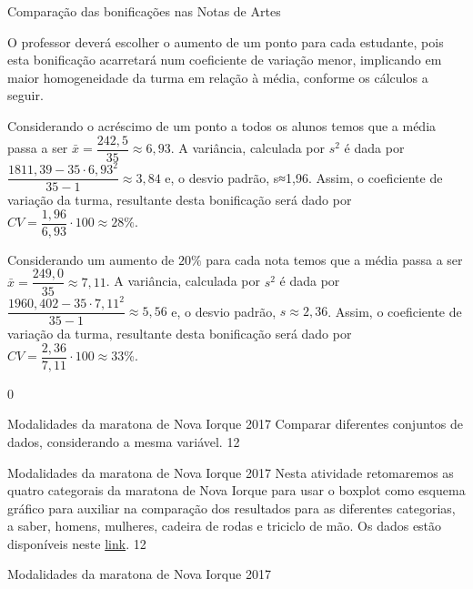 {{{\begin{answer}{Comparação das bonificações nas Notas de Artes}
{
O professor deverá escolher o aumento de um ponto para cada estudante, pois esta bonificação acarretará num coeficiente de variação menor, implicando em maior homogeneidade da turma em relação à média, conforme os cálculos a seguir.

Considerando o acréscimo de um ponto a todos os alunos temos que a média passa a ser $\bar{x}=\dfrac{242{,}5}{35}\approx6{,}93$. A variância, calculada por $s^2$ é dada por $\dfrac{1811{,}39-35\cdot6{,}93^2}{35-1}\approx3{,}84$ e, o desvio padrão, s≈1,96. Assim, o coeficiente de variação da turma, resultante desta bonificação será dado por $CV=\dfrac{1{,}96}{6{,}93}\cdot100\approx28\%$.

Considerando um aumento de $20\%$ para cada nota temos que a média passa a ser $\bar{x}=\dfrac{249{,}0}{35}\approx7{,}11$. A variância, calculada por $s^2$ é dada por $\dfrac{1960{,}402-35\cdot7{,}11^2}{35-1}\approx5{,}56$ e, o desvio padrão, $s\approx2{,}36$. Assim, o coeficiente de variação da turma, resultante desta bonificação será dado por $CV=\dfrac{2{,}36}{7{,}11}\cdot100\approx33$\%.
}{0}
\end{answer}

\clearmargin

\begin{objectives}{Modalidades da maratona de Nova Iorque 2017}
{
 Comparar diferentes conjuntos de dados, considerando a mesma variável.
}{1}{2}
\end{objectives}
\begin{sugestions}{Modalidades da maratona de Nova Iorque 2017}
{
Nesta atividade retomaremos as quatro categorais da maratona de Nova Iorque para usar o boxplot como esquema gráfico para auxiliar na comparação dos resultados para as diferentes categorias, a saber, homens, mulheres, cadeira de rodas e triciclo de mão. Os dados estão disponíveis neste \href{https://ggbm.at/ZhqKD9Nz}{link}.
}{1}{2}
\end{sugestions}
\begin{answer}{Modalidades da maratona de Nova Iorque 2017}
{
}
\end{answer}}}}

